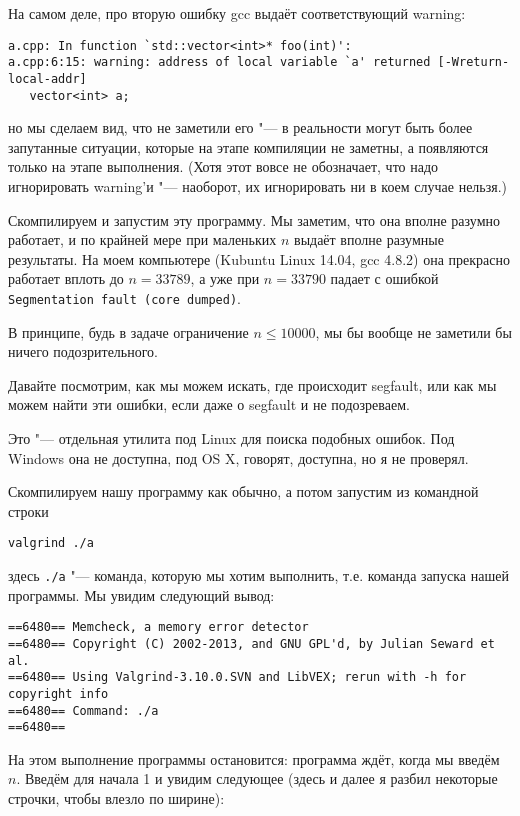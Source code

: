 На самом деле, про вторую ошибку gcc выдаёт соответствующий warning:
\begin{verbatim}
a.cpp: In function `std::vector<int>* foo(int)':
a.cpp:6:15: warning: address of local variable `a' returned [-Wreturn-local-addr]
   vector<int> a;
\end{verbatim}
но мы сделаем вид, что не заметили его "--- в реальности могут быть более запутанные ситуации, которые на этапе компиляции не заметны, а появляются
только на этапе выполнения. 
(Хотя этот вовсе не обозначает, что надо игнорировать warning'и "--- наоборот, их игнорировать ни в коем случае нельзя.)

Скомпилируем и запустим эту программу. 
Мы заметим, что она вполне разумно работает, и по крайней мере при маленьких $n$ выдаёт вполне разумные результаты.
На моем компьютере (Kubuntu Linux 14.04, gcc 4.8.2) она прекрасно работает вплоть до $n=33789$, 
а уже при $n=33790$ падает с ошибкой \verb`Segmentation fault (core dumped)`.

В принципе, будь в задаче ограничение $n\leq 10000$, мы бы вообще не заметили бы ничего подозрительного.

Давайте посмотрим, как мы можем искать, где происходит segfault, или как мы можем найти эти ошибки, если даже о segfault и не подозреваем.

 Это "--- отдельная утилита под Linux для поиска подобных ошибок. Под Windows она не доступна, под OS X, говорят, доступна, но я не проверял.

Скомпилируем нашу программу как обычно, а потом запустим из командной строки
\begin{verbatim}
valgrind ./a
\end{verbatim}
здесь \verb`./a` "--- команда, которую мы хотим выполнить, т.е. команда запуска нашей программы. Мы увидим следующий вывод:
\begin{verbatim}
==6480== Memcheck, a memory error detector
==6480== Copyright (C) 2002-2013, and GNU GPL'd, by Julian Seward et al.
==6480== Using Valgrind-3.10.0.SVN and LibVEX; rerun with -h for copyright info
==6480== Command: ./a
==6480== 
\end{verbatim}
На этом выполнение программы остановится: программа ждёт, когда мы введём $n$. 
Введём для начала 1 и увидим следующее (здесь и далее я разбил некоторые строчки, чтобы влезло по ширине):

